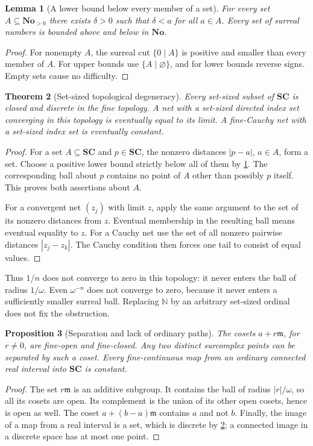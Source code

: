 \documentclass[11pt,letterpaper]{article}
\newtheorem{theorem}{Theorem}[section]
\newtheorem{lemma}[theorem]{Lemma}
\newtheorem{proposition}[theorem]{Proposition}
\theoremstyle{definition}
\theoremstyle{remark}
\newcommand{\No}{\mathbf{No}}
\newcommand{\SC}{\mathbf{SC}}
\newcommand{\N}{\mathbb N}
\newcommand{\mm}{\mathfrak m}
\numberwithin{equation}{section}
\begin{document}
\begin{lemma}[A lower bound below every member of a set]\label{lem:small}
For every set $A\subseteq\No_{>0}$ there exists $\delta>0$ such that $\delta<a$ for all $a\in A$. Every set of surreal numbers is bounded above and below in $\No$.
\end{lemma}
\begin{proof}
For nonempty $A$, the surreal cut $\{0\mid A\}$ is positive and smaller than every member of $A$. For upper bounds use $\{A\mid\varnothing\}$, and for lower bounds reverse signs. Empty sets cause no difficulty.
\end{proof}

\begin{theorem}[Set-sized topological degeneracy]\label{thm:discrete}
Every set-sized subset of $\SC$ is closed and discrete in the fine topology. A net with a set-sized directed index set converging in this topology is eventually equal to its limit. A fine-Cauchy net with a set-sized index set is eventually constant.
\end{theorem}
\begin{proof}
For a set $A\subseteq\SC$ and $p\in\SC$, the nonzero distances $|p-a|$, $a\in A$, form a set. Choose a positive lower bound strictly below all of them by \cref{lem:small}. The corresponding ball about $p$ contains no point of $A$ other than possibly $p$ itself. This proves both assertions about $A$.

For a convergent net $(z_j)$ with limit $z$, apply the same argument to the set of its nonzero distances from $z$. Eventual membership in the resulting ball means eventual equality to $z$. For a Cauchy net use the set of all nonzero pairwise distances $|z_j-z_k|$. The Cauchy condition then forces one tail to consist of equal values.
\end{proof}
Thus $1/n$ does not converge to zero in this topology: it never enters the ball of radius $1/\omega$. Even $\omega^{-n}$ does not converge to zero, because it never enters a sufficiently smaller surreal ball. Replacing $\N$ by an arbitrary set-sized ordinal does not fix the obstruction.

\begin{proposition}[Separation and lack of ordinary paths]\label{prop:clopen}
The cosets $a+r\mm$, for $r\ne0$, are fine-open and fine-closed. Any two distinct surcomplex points can be separated by such a coset. Every fine-continuous map from an ordinary connected real interval into $\SC$ is constant.
\end{proposition}
\begin{proof}
The set $r\mm$ is an additive subgroup. It contains the ball of radius $|r|/\omega$, so all its cosets are open. Its complement is the union of its other open cosets, hence is open as well. The coset $a+(b-a)\mm$ contains $a$ and not $b$. Finally, the image of a map from a real interval is a set, which is discrete by \cref{thm:discrete}; a connected image in a discrete space has at most one point.
\end{proof}
\end{document}
